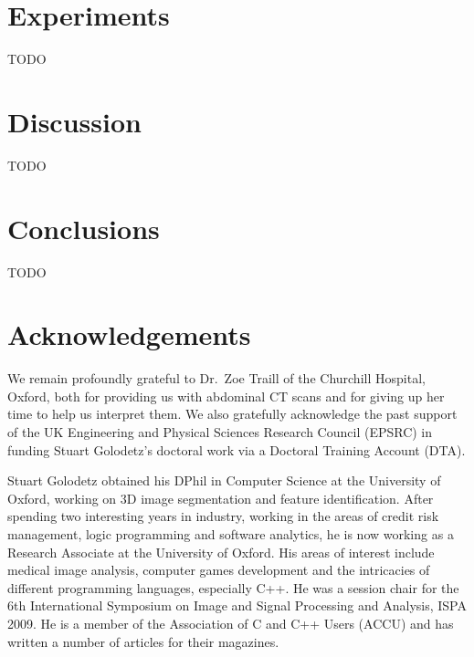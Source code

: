 \documentclass[10pt,twocolumn,twoside]{IEEEtran}
\begin{document}
\section{Experiments}
\label{sec:experiments}

TODO

\section{Discussion}
\label{sec:discussion}

TODO

\section{Conclusions}
\label{sec:conclusions}

TODO

\section{Acknowledgements}

We remain profoundly grateful to Dr.\ Zoe Traill of the Churchill Hospital, Oxford, both for providing us with abdominal CT scans and for giving up her time to help us interpret them. We also gratefully acknowledge the past support of the UK Engineering and Physical Sciences Research Council (EPSRC) in funding Stuart Golodetz's doctoral work via a Doctoral Training Account (DTA).

\clearpage




\vspace{3cm}

\begin{IEEEbiography}{Stuart Golodetz}
obtained his DPhil in Computer Science at the University of Oxford, working on 3D image segmentation and feature identification. After spending two interesting years in industry, working in the areas of credit risk management, logic programming and software analytics, he is now working as a Research Associate at the University of Oxford. His areas of interest include medical image analysis, computer games development and the intricacies of different programming languages, especially C++. He was a session chair for the 6th International Symposium on Image and Signal Processing and Analysis, ISPA 2009. He is a member of the Association of C and C++ Users (ACCU) and has written a number of articles for their magazines.
\end{IEEEbiography}
\end{document}
